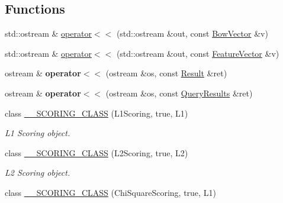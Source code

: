 \subsection*{Functions}
\begin{DoxyCompactItemize}
\item 
std\+::ostream \& \hyperlink{namespaceDBoW2_a06d2058b1bde1cdc49f277fec62073e2}{operator$<$$<$} (std\+::ostream \&out, const \hyperlink{classDBoW2_1_1BowVector}{Bow\+Vector} \&v)
\item 
std\+::ostream \& \hyperlink{namespaceDBoW2_ac65e2bfb945a77c5294d0300a4fed49c}{operator$<$$<$} (std\+::ostream \&out, const \hyperlink{classDBoW2_1_1FeatureVector}{Feature\+Vector} \&v)
\item 
\mbox{\label{namespaceDBoW2_a844104f9efe003ab6ac6a87f11b59b62}} 
ostream \& {\bfseries operator$<$$<$} (ostream \&os, const \hyperlink{classDBoW2_1_1Result}{Result} \&ret)
\item 
\mbox{\label{namespaceDBoW2_ac7e2118649f868c5dd79ced3c03a362e}} 
ostream \& {\bfseries operator$<$$<$} (ostream \&os, const \hyperlink{classDBoW2_1_1QueryResults}{Query\+Results} \&ret)
\item 
\mbox{\label{namespaceDBoW2_a75539718457109a0efbd4778f7fa7369}} 
class \hyperlink{namespaceDBoW2_a75539718457109a0efbd4778f7fa7369}{\+\_\+\+\_\+\+S\+C\+O\+R\+I\+N\+G\+\_\+\+C\+L\+A\+SS} (L1\+Scoring, true, L1)
\begin{DoxyCompactList}\small\item\em L1 Scoring object. \end{DoxyCompactList}\item 
\mbox{\label{namespaceDBoW2_ac7a02f9992dcadb8af97192765c6d9d3}} 
class \hyperlink{namespaceDBoW2_ac7a02f9992dcadb8af97192765c6d9d3}{\+\_\+\+\_\+\+S\+C\+O\+R\+I\+N\+G\+\_\+\+C\+L\+A\+SS} (L2\+Scoring, true, L2)
\begin{DoxyCompactList}\small\item\em L2 Scoring object. \end{DoxyCompactList}\item 
\mbox{\label{namespaceDBoW2_a6f9c1118526ece0dc3ed4054266fbdda}} 
class \hyperlink{namespaceDBoW2_a6f9c1118526ece0dc3ed4054266fbdda}{\+\_\+\+\_\+\+S\+C\+O\+R\+I\+N\+G\+\_\+\+C\+L\+A\+SS} (Chi\+Square\+Scoring, true, L1)

\end{DoxyCompactItemize}
